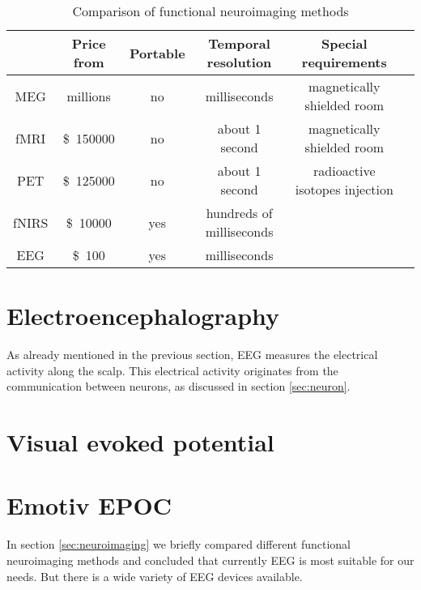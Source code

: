 
\newcommand{\pMEG}{\tablefootnote{http://neurogadget.com/2012/12/15/inexpensive-magnetoencephalography-meg-system-could-be-available-at-every-hospital/6495}}
\newcommand{\pfMRI}{\tablefootnote{http://info.blockimaging.com/bid/92623/MRI-Machine-Cost-and-Price-Guide}}
\newcommand{\pPET}{\tablefootnote{http://info.blockimaging.com/bid/68875/How-Much-Does-a-PET-CT-Scanner-Cost}}
\newcommand{\plEEG}{\tablefootnote{http://en.wikipedia.org/wiki/Comparison\_of\_consumer\_brain-computer\_interfaces}}
\newcommand{\phEEG}{\tablefootnote{http://www.brainvision.com/files/actiCHamp-PyCorder-Flyer\_US.pdf}}
\newcommand{\pNIRS}{\cite{NIRS}}
\newcommand{\tresol}{\cite{timeresol}}


\begin{table}[h]
	\centering
	\begin{tabular}{|c|c|c|c|c|c|}
	\hline
				& Price	from				& Portable	& Temporal resolution 	& Special requirements		\\\hline
MEG				& millions\pMEG				& no	& milliseconds \tresol		& magnetically shielded room\\\hline
fMRI			& \SI{150000}[\$]\pfMRI		& no	& about 1 second \tresol	& magnetically shielded room\\\hline
PET				& \SI{125000}[\$]\pPET		& no	& about 1 second \tresol	& radioactive isotopes injection\\\hline
fNIRS			& \SI{10000}[\$]{} \pNIRS 	& yes	& hundreds of milliseconds \pNIRS&						\\\hline
\acrshort{EEG}	& \SI{100}[\$]\plEEG		& yes	& milliseconds \tresol 		&							\\\hline
	\end{tabular}
	\caption{Comparison of functional neuroimaging methods}
	\label{tab:neuroimaging}
\end{table}

\section{Electroencephalography}

As already mentioned in the previous section, \acrshort{EEG} measures the electrical activity along the scalp. This electrical activity originates from the communication between neurons, as discussed in section \ref{sec:neuron}. 

\section{Visual evoked potential}

\section{Emotiv EPOC}
In section \ref{sec:neuroimaging} we briefly compared different functional neuroimaging methods and concluded that currently \acrshort{EEG} is most suitable for our needs. But there is a wide variety of EEG devices available. 
 